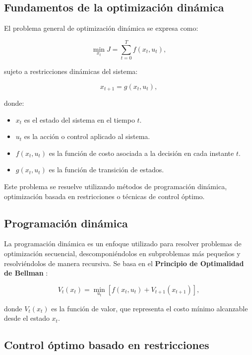 \begin{itemize}
		\subsection{Fundamentos de la optimización dinámica}
		
		El problema general de optimización dinámica se expresa como:
		
		\begin{equation}
			\min_{x_t} J = \sum_{t=0}^{T} f(x_t, u_t),
		\end{equation}
		
		sujeto a restricciones dinámicas del sistema:
		
		\begin{equation}
			x_{t+1} = g(x_t, u_t),
		\end{equation}
		
		donde:
		\begin{itemize}
			\item \( x_t \) es el estado del sistema en el tiempo \( t \).
			\item \( u_t \) es la acción o control aplicado al sistema.
			\item \( f(x_t, u_t) \) es la función de costo asociada a la decisión en cada instante \( t \).
			\item \( g(x_t, u_t) \) es la función de transición de estados.
		\end{itemize}
		
		Este problema se resuelve utilizando métodos de programación dinámica, optimización basada en restricciones o técnicas de control óptimo.
		
		\subsection{Programación dinámica}
		
		La programación dinámica es un enfoque utilizado para resolver problemas de optimización secuencial, descomponiéndolos en subproblemas más pequeños y resolviéndolos de manera recursiva. Se basa en el \textbf{Principio de Optimalidad de Bellman} \cite{bellman1957dynamic}:
		
		\begin{equation}
			V_t(x_t) = \min_{u_t} \left[ f(x_t, u_t) + V_{t+1}(x_{t+1}) \right],
		\end{equation}
		
		donde \( V_t(x_t) \) es la función de valor, que representa el costo mínimo alcanzable desde el estado \( x_t \).
		
		\subsection{Control óptimo basado en restricciones}
		

\end{itemize}
